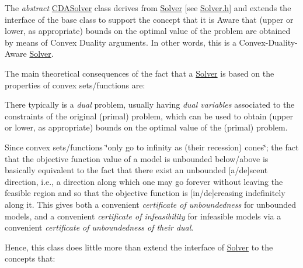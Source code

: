 The {\itshape abstract} \mbox{\hyperlink{class_s_m_spp__di__unipi__it_1_1_c_d_a_solver}{C\+D\+A\+Solver}} class derives from \mbox{\hyperlink{class_s_m_spp__di__unipi__it_1_1_solver}{Solver}} \mbox{[}see \mbox{\hyperlink{_solver_8h}{Solver.\+h}}\mbox{]} and extends the interface of the base class to support the concept that it is Aware that (upper or lower, as appropriate) bounds on the optimal value of the problem are obtained by means of Convex Duality arguments. In other words, this is a Convex-\/\+Duality-\/\+Aware \mbox{\hyperlink{class_s_m_spp__di__unipi__it_1_1_solver}{Solver}}.

The main theoretical consequences of the fact that a \mbox{\hyperlink{class_s_m_spp__di__unipi__it_1_1_solver}{Solver}} is based on the properties of convex sets/functions are\+:


\begin{DoxyItemize}
\item There typically is a {\itshape dual} problem, usually having {\itshape dual variables} associated to the constraints of the original (primal) problem, which can be used to obtain (upper or lower, as appropriate) bounds on the optimal value of the (primal) problem.
\item Since convex sets/functions \char`\"{}only go to infinity as (their recession)
  cones\char`\"{}; the fact that the objective function value of a model is unbounded below/above is basically equivalent to the fact that there exist an unbounded \mbox{[}a/de\mbox{]}scent direction, i.\+e., a direction along which one may go forever without leaving the feasible region and so that the objective function is \mbox{[}in/de\mbox{]}creasing indefinitely along it. This gives both a convenient {\itshape certificate of unboundedness} for unbounded models, and a convenient {\itshape certificate of infeasibility} for infeasible models via a convenient {\itshape certificate of unboundedness of their dual}.
\end{DoxyItemize}

Hence, this class does little more than extend the interface of \mbox{\hyperlink{class_s_m_spp__di__unipi__it_1_1_solver}{Solver}} to the concepts that\+:


